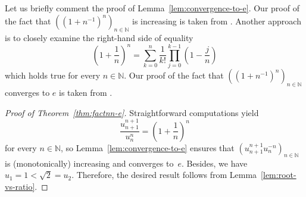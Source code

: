 \documentclass[12pt]{article}
\newcommand{\bN}{\mathbb{N}} %
\begin{document}
Let us briefly comment the proof of Lemma~\ref{lem:convergence-to-e}.
Our proof of the fact that $\left( \left( 1 + n^{-1} \right)^n  \right)_{n \in \bN}$
is increasing is taken from \cite{Wiener85}.
Another approach \cite{GiaquintaModicaApprox} is to closely examine the right-hand side of equality 
$$ 
\left(1 + \frac{1}{n} \right)^n = \sum_{k = 0}^n \frac{1}{k!} \prod_{j = 0}^{k - 1} \left(1 - \frac{j}{n} \right) 
$$
which holds true for every $n \in \bN$.
Our proof of the fact that
$\left( \left( 1 + n^{-1} \right)^n  \right)_{n \in \bN}$ converges to $e$ is taken from \cite{RudinPrinciples}.


\begin{proof}[Proof of Theorem~\ref{thm:factnn-e}]
  Straightforward computations yield
  $$
  \frac{u_{n + 1}^{n + 1}}{u_n^n} 
  = \left(1 + \frac{1}{n} \right)^n  
  $$
  for every $n \in \bN$,
  so Lemma~\ref{lem:convergence-to-e} ensures that 
  $\left( u_{n + 1}^{n + 1} u_n^{- n} \right)_{n \in \bN}$ is (monotonically) increasing and converges to~$e$.
  Besides, we have $u_1 = 1 < \sqrt{2} = u_2$.
  Therefore, the desired result follows from Lemma~\ref{lem:root-vs-ratio}.
\end{proof} 



\end{document}
